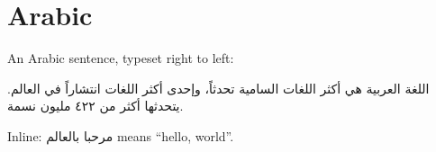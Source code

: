 \documentclass{article}
\begin{document}
\section{Arabic}
An Arabic sentence, typeset right to left:
\begin{Arabic}
اللغة العربية هي أكثر اللغات السامية تحدثاً، وإحدى أكثر اللغات انتشاراً في العالم.
يتحدثها أكثر من ٤٢٢ مليون نسمة.
\end{Arabic}
Inline: \textarabic{مرحبا بالعالم} means ``hello, world''.
\end{document}
